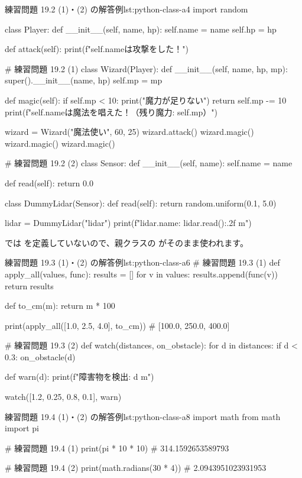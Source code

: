 \begin{codelisting}[style=python]{練習問題 19.2 (1)・(2) の解答例}{lst:python-class-a4}
import random


class Player:
    def __init__(self, name, hp):
        self.name = name
        self.hp = hp

    def attack(self):
        print(f"{self.name}は攻撃をした！")


# 練習問題 19.2 (1)
class Wizard(Player):
    def __init__(self, name, hp, mp):
        super().__init__(name, hp)
        self.mp = mp

    def magic(self):
        if self.mp < 10:
            print("魔力が足りない")
            return
        self.mp -= 10
        print(f"{self.name}は魔法を唱えた！（残り魔力: {self.mp}）")


wizard = Wizard("魔法使い", 60, 25)
wizard.attack()
wizard.magic()
wizard.magic()
wizard.magic()


# 練習問題 19.2 (2)
class Sensor:
    def __init__(self, name):
        self.name = name

    def read(self):
        return 0.0


class DummyLidar(Sensor):
    def read(self):
        return random.uniform(0.1, 5.0)


lidar = DummyLidar("lidar")
print(f"{lidar.name}: {lidar.read():.2f} m")
\end{codelisting}

 では  を定義していないので、親クラスの  がそのまま使われます。

\begin{codelisting}[style=python]{練習問題 19.3 (1)・(2) の解答例}{lst:python-class-a6}
# 練習問題 19.3 (1)
def apply_all(values, func):
    results = []
    for v in values:
        results.append(func(v))
    return results


def to_cm(m):
    return m * 100


print(apply_all([1.0, 2.5, 4.0], to_cm))   # [100.0, 250.0, 400.0]


# 練習問題 19.3 (2)
def watch(distances, on_obstacle):
    for d in distances:
        if d < 0.3:
            on_obstacle(d)


def warn(d):
    print(f"障害物を検出: {d} m")


watch([1.2, 0.25, 0.8, 0.1], warn)
\end{codelisting}

\begin{codelisting}[style=python]{練習問題 19.4 (1)・(2) の解答例}{lst:python-class-a8}
import math
from math import pi

# 練習問題 19.4 (1)
print(pi * 10 * 10)                # 314.1592653589793

# 練習問題 19.4 (2)
print(math.radians(30 * 4))        # 2.0943951023931953
\end{codelisting}

